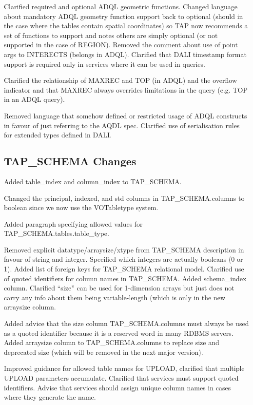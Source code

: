 \documentclass[11pt,letter]{ivoa}
\newcommand{\tapschema}{TAP\_SCHEMA}
\newcommand{\tapschema}{\mbox{%
  \relsize{-0.5}TAP\discretionary{-}{}{\kern-2pt\_}SCHEMA}}
\begin{document}
Clarified required and optional ADQL geometric functions.
Changed language about mandatory ADQL geometry function support back to optional (should in
the case where the tables contain spatial coordinates) so TAP now recommends a set of functions to support and notes others are simply optional (or not supported in the case of REGION). Removed the comment about use of point args to INTERECTS (belongs in ADQL). Clarified that DALI timestamp format support is required only in services where it can be used in queries.

Clarified the relationship of MAXREC and TOP (in ADQL) and the overflow 
indicator and that MAXREC always overrides limitations in the query (e.g. 
TOP in an ADQL query).

Removed language that somehow defined or restricted usage of ADQL constructs in
favour of just referring to the AQDL spec. Clarified use of serialisation
rules for extended types defined in DALI.

\subsection{TAP\_SCHEMA Changes}

Added table\_index and column\_index to \tapschema.

Changed the principal, indexed, and std columns in \tapschema.columns to boolean since we
now use the VOTabletype system.

Added paragraph specifying allowed values for \tapschema.tables.table\_type.

Removed explicit datatype/arraysize/xtype from \tapschema{} description
in favour of string and integer. Specified which integers are actually
booleans (0 or 1). Added list of foreign keys for \tapschema{}
relational model. Clarified use of quoted identifiers for column names in 
\tapschema. Added schema\_index column.
Clarified ``size'' can be used for 1-dimension arrays but just does not carry any info about them being variable-length (which is only in the new arraysize column.

Added advice that the size column \tapschema.columns must always be used 
as a quoted identifier because it is a reserved word in many RDBMS 
servers. Added arraysize column to \tapschema.columns to replace size and 
deprecated size (which will be removed in the next major version).

Improved guidance for allowed table names for UPLOAD, clarified that 
multiple UPLOAD parameters accumulate. Clarified that services 
must support quoted identifiers. Advise that services should assign unique 
column names in cases where they generate the name.
\end{document}
